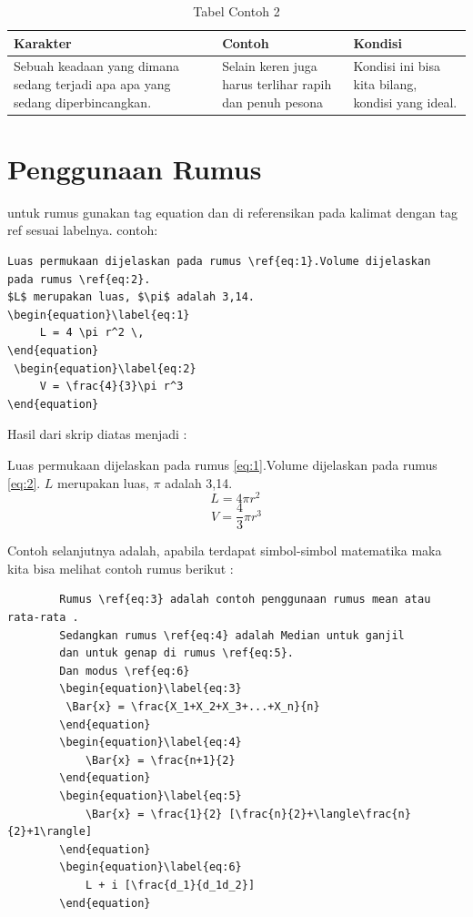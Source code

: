 \begin{table}[ht]
\caption{Tabel Contoh 2}
\centering
\begin{tabular}{p{1.25in}p{1.25in}p{1.25in}}
\hline
Karakter&Contoh&Kondisi\\
\hline
Sebuah keadaan yang dimana sedang terjadi apa apa yang sedang diperbincangkan.&
Selain keren juga harus terlihar rapih dan penuh pesona&
Kondisi ini bisa kita bilang, kondisi yang ideal.\\
\hline
\end{tabular}
\label{table:contohtabel2}
\end{table}


\section{Penggunaan Rumus}

untuk rumus gunakan tag equation dan di referensikan pada kalimat dengan tag ref sesuai labelnya. contoh:
\begin{verbatim}
Luas permukaan dijelaskan pada rumus \ref{eq:1}.Volume dijelaskan 
pada rumus \ref{eq:2}.
$L$ merupakan luas, $\pi$ adalah 3,14.
\begin{equation}\label{eq:1}
     L = 4 \pi r^2 \,
\end{equation}
 \begin{equation}\label{eq:2}
     V = \frac{4}{3}\pi r^3
\end{equation}
\end{verbatim}
Hasil dari skrip diatas menjadi :

Luas permukaan dijelaskan pada rumus \ref{eq:1}.Volume dijelaskan 
pada rumus \ref{eq:2}.
$L$ merupakan luas, $\pi$ adalah 3,14.
\begin{equation}\label{eq:1}
     L = 4 \pi r^2 \,
\end{equation}
 \begin{equation}\label{eq:2}
     V = \frac{4}{3}\pi r^3
\end{equation}
 
Contoh selanjutnya adalah, apabila terdapat simbol-simbol matematika maka kita bisa melihat contoh rumus berikut :

    \begin{verbatim}
		Rumus \ref{eq:3} adalah contoh penggunaan rumus mean atau rata-rata .
		Sedangkan rumus \ref{eq:4} adalah Median untuk ganjil  
		dan untuk genap di rumus \ref{eq:5}.
		Dan modus \ref{eq:6}
		\begin{equation}\label{eq:3}
		 \Bar{x} = \frac{X_1+X_2+X_3+...+X_n}{n}    
		\end{equation}
		\begin{equation}\label{eq:4}
		    \Bar{x} = \frac{n+1}{2}
		\end{equation}
		\begin{equation}\label{eq:5}
		    \Bar{x} = \frac{1}{2} [\frac{n}{2}+\langle\frac{n}{2}+1\rangle]
		\end{equation}
		\begin{equation}\label{eq:6}
		    L + i [\frac{d_1}{d_1d_2}]
		\end{equation}
    \end{verbatim}

